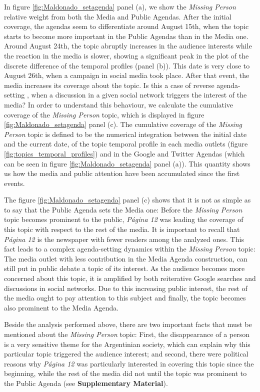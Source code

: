 \documentclass{bmcart}
\begin{document}
\par In figure \ref{fig:Maldonado_setagenda} panel (a), we show the \emph{Missing Person} relative weight from both the Media and Public Agendas. 
After the initial coverage, the agendas seem to differentiate around August 15th, when the topic starts to become more important in the Public Agendas than in the Media one. 
Around August 24th, the topic abruptly increases in the audience interests while the reaction in the media is slower, showing a significant peak in the plot of the discrete difference of the temporal profiles (panel (b)). This date is very close to August 26th, when a campaign in social media took place. After that event, the media increases its coverage about the topic. 
Is this a case of reverse agenda-setting \cite{russell2014dynamics}, when a discussion in a given social network triggers the interest of the media? 
In order to understand this behaviour, we calculate the cumulative coverage of the \emph{Missing Person} topic, which is displayed in figure \ref{fig:Maldonado_setagenda} panel (c).
The cumulative coverage of the \emph{Missing Person} topic is defined to be the numerical integration between the initial date and the current date, of the topic temporal profile in each media outlets (figure \ref{fig:topics_temporal_profiles}) and in the Google and Twitter Agendas (which can be seen in figure \ref{fig:Maldonado_setagenda} panel (a)). 
This quantity shows us how the media and public attention have been accumulated since the first events.
\par The figure \ref{fig:Maldonado_setagenda} panel (c) shows that it is not as simple as to say that the Public Agenda sets the Media one: 
Before the \emph{Missing Person} topic becomes prominent to the public, \emph{P\'agina 12} was leading the coverage of this topic with respect to the rest of the media.
It is important to recall that \emph{P\'agina 12} is the newspaper with fewer readers among the analyzed ones.
This fact leads to a complex agenda-setting dynamics within the \emph{Missing Person} topic: The media outlet with less contribution in the Media Agenda construction, can still put in public debate a topic of its interest.
As the audience becomes more concerned about this topic, it is amplified by both reiterative Google searches and discussions in social networks. Due to this increasing public interest, the rest of the media ought to pay attention to this subject and finally, the topic becomes also prominent to the Media Agenda. 
\par Beside the analysis performed above, there are two important facts that must be mentioned about the \emph{Missing Person} topic: First, the disappearance of a person is a very sensitive theme for the Argentinian society, which can explain why this particular topic triggered the audience interest; and second, there were political reasons why \emph{P\'agina 12} was particularly interested in covering this topic since the beginning, while the rest of the media did not until the topic was prominent to the Public Agenda (see \textbf{Supplementary Material}).
\end{document}
